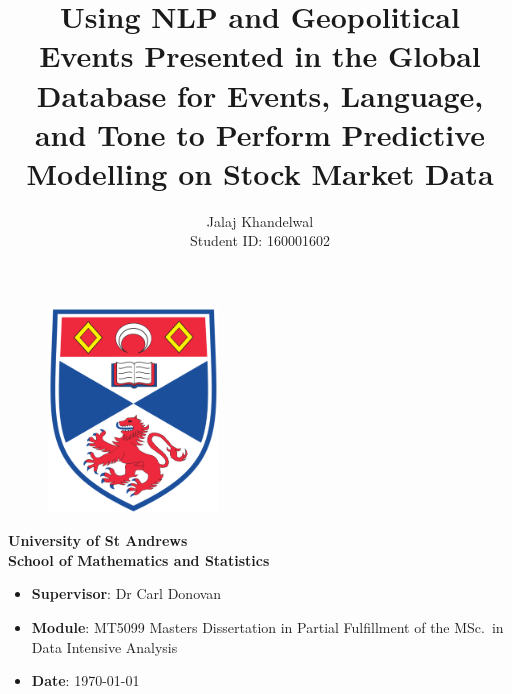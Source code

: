 \documentclass[a4paper]{article}
\begin{document}
\title{Using NLP and Geopolitical Events Presented in the Global Database for Events, Language, and Tone to Perform Predictive Modelling on Stock Market Data}
\author{Jalaj Khandelwal\\Student ID: 160001602}
\date{}
 \thispagestyle{empty}
	
	\begin{titlepage}
		\vspace{\fill}
		\maketitle
		 \thispagestyle{empty}
		\begin{figure}[H]
			\centering
			\includegraphics[width=0.4\textwidth]{Images/SchoolLogo.png}
		\end{figure}
		\begin{center}
			\Large\textbf{University of St Andrews}\\
			\vspace{1cm}
			\Large\textbf{School of Mathematics and Statistics}
		\end{center}
		
		\vspace{\fill}
		\Large%
		\begin{itemize}
			\renewcommand\labelitemi{--}
			\item[] \textbf{Supervisor}: Dr Carl Donovan  
			\item[] \textbf{Module}: MT5099 Masters Dissertation in Partial Fulfillment of the MSc.\ in Data Intensive Analysis
			\item[] \textbf{Date}: \today
		\end{itemize}
		\vspace{\fill}
	\end{titlepage}



\end{document}
